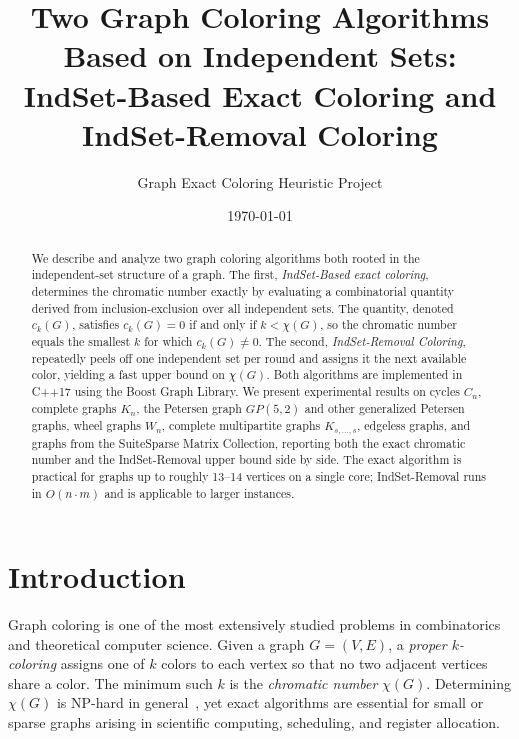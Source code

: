 \documentclass[11pt]{article}
\title{\textbf{Two Graph Coloring Algorithms Based on Independent Sets:\\
IndSet-Based Exact Coloring and IndSet-Removal Coloring}}
\author{Graph Exact Coloring Heuristic Project}
\date{\today}
\begin{document}
\maketitle

\begin{abstract}
We describe and analyze two graph coloring algorithms both rooted in the
independent-set structure of a graph.  The first, \emph{IndSet-Based exact
coloring}, determines the chromatic number exactly by evaluating a
combinatorial quantity derived from inclusion-exclusion over all independent
sets.  The quantity, denoted $c_k(G)$, satisfies $c_k(G) = 0$ if and only if
$k < \chi(G)$, so the chromatic number equals the smallest $k$ for which
$c_k(G) \neq 0$.  The second, \emph{IndSet-Removal Coloring}, repeatedly peels
off one independent set per round and assigns it the next available color,
yielding a fast upper bound on $\chi(G)$.  Both algorithms are implemented in
C++17 using the Boost Graph Library.  We present experimental results on
cycles $C_n$, complete graphs $K_n$, the Petersen graph $GP(5,2)$ and other
generalized Petersen graphs, wheel graphs $W_n$, complete multipartite graphs
$K_{s,\ldots,s}$, edgeless graphs, and graphs from the SuiteSparse Matrix
Collection, reporting both the exact chromatic number and the IndSet-Removal
upper bound side by side.  The exact algorithm is practical for graphs up to
roughly 13--14 vertices on a single core; IndSet-Removal runs in $O(n \cdot m)$
and is applicable to larger instances.
\end{abstract}

\tableofcontents
\vspace{1em}

\section{Introduction}

Graph coloring is one of the most extensively studied problems in combinatorics
and theoretical computer science.  Given a graph $G=(V,E)$, a \emph{proper
$k$-coloring} assigns one of $k$ colors to each vertex so that no two adjacent
vertices share a color.  The minimum such $k$ is the \emph{chromatic number}
$\chi(G)$.  Determining $\chi(G)$ is NP-hard in general~\cite{Karp1972}, yet
exact algorithms are essential for small or sparse graphs arising in scientific
computing, scheduling, and register allocation.
\end{document}
